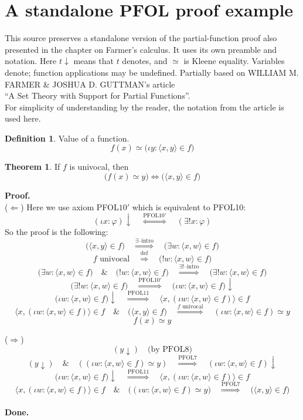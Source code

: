 \documentclass[10pt,a4paper]{article}
\theoremstyle{definition}
\newtheorem{definition}{Definition}
\newtheorem{theorem}{Theorem}
\newcommand{\Proof}{\noindent \textbf{Proof.}\\}
\newcommand{\Done}{\noindent \textbf{Done.}\\}
\begin{document}
\section{A standalone PFOL proof example}
This source preserves a standalone version of the partial-function proof
also presented in the chapter on Farmer's calculus. It uses its own
preamble and notation. Here $t\downarrow$ means that $t$ denotes, and
$\simeq$ is Kleene equality. Variables denote; function applications may
be undefined.
Partially based on WILLIAM M. FARMER \& JOSHUA D. GUTTMAN's article\\
``A Set Theory with Support for Partial Functions''.\\
For simplicity of understanding by the reader, the notation from the article is used here.\\
\begin{definition} Value of a function.
$$f(x) \simeq \big(\iota y: \langle x,y\rangle\in f\big)$$
\end{definition}

\begin{theorem} If $f$ is univocal, then
$$\big(f(x)\simeq y\big)\Leftrightarrow \big(\langle x,y\rangle\in f\big)$$
\end{theorem}
\Proof
($\Leftarrow$) Here we use axiom PFOL$10'$ which is equivalent to PFOL10:
$$
(\iota x:\varphi)\downarrow
\quad\overset{\mbox{PFOL10}'}{\Longleftrightarrow}\quad
(\exists!x:\varphi)
$$
So the proof is the following:
$$
\big(\langle x,y\rangle\in f\big)
\quad\overset{\exists\mbox{--intro}}{\Longrightarrow}\quad
\big(\exists w: \langle x,w\rangle\in f\big)
$$
$$
f\mbox{ univocal}
\quad\overset{\mbox{def}}{\Longrightarrow}\quad
\big(! w: \langle x,w\rangle\in f\big)
$$
$$
\big(\exists w: \langle x,w\rangle\in f\big)
\quad\&\quad
\big(! w: \langle x,w\rangle\in f\big)
\quad\overset{\exists!\mbox{--intro}}{\Longrightarrow}\quad
\big(\exists! w: \langle x,w\rangle\in f\big)
$$
$$
\big(\exists! w: \langle x,w\rangle\in f\big)
\quad\overset{\mbox{PFOL10}'}{\Longrightarrow}\quad
\big(\iota w: \langle x,w\rangle\in f\big)\downarrow
$$
$$
\big(\iota w: \langle x,w\rangle\in f\big)\downarrow
\quad\overset{\mbox{PFOL11}}{\Longrightarrow}\quad
\langle x,(\iota w: \langle x,w\rangle\in f)\rangle\in f
$$
$$
\langle x,(\iota w: \langle x,w\rangle\in f)\rangle\in f
\quad\&\quad
\big(\langle x,y\rangle\in f\big)
\quad\overset{f \mbox{ univocal}}{\Longrightarrow}\quad
(\iota w: \langle x,w\rangle\in f) \simeq y
$$
$$
f(x) \simeq y
$$

\noindent($\Rightarrow$)
$$(y\downarrow)\quad\mbox{(by PFOL8)}$$
$$
(y\downarrow)\quad\&\quad((\iota w: \langle x,w\rangle\in f)\simeq y) \quad\overset{\mbox{PFOL7}}{\Longrightarrow}\quad
(\iota w: \langle x,w\rangle\in f)\downarrow $$
$$
\big(\iota w: \langle x,w\rangle\in f\big)\downarrow
\quad\overset{\mbox{PFOL11}}{\Longrightarrow}\quad
\langle x,(\iota w: \langle x,w\rangle\in f)\rangle\in f
$$
$$
\langle x,(\iota w: \langle x,w\rangle\in f)\rangle\in f
\quad\&\quad
\big((\iota w: \langle x,w\rangle\in f)\simeq y\big)
\quad\overset{\mbox{PFOL7}}{\Longrightarrow}\quad
\big(\langle x, y\rangle\in f\big)
$$
\\
\Done
\end{document}
